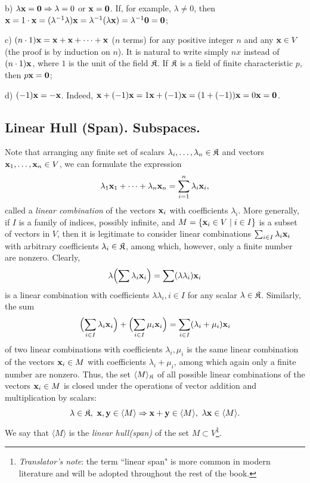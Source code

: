 b) $\lambda \vx =\v0\Rightarrow \lambda =0$ or $\vx =\v0$. If, for example, $\lambda\ne 0$, then $\vx =1\cdot\vx =(\lambda^{-1}\lambda)\vx =\lambda^{-1}(\lambda\vx)=\lambda^{-1}\v0=\v0$;

c) $(n\cdot 1){\mathbf{x}} ={\mathbf{x}} +{\mathbf{x}} +\dots +{\mathbf{x}}$ ($n$ terms) for any positive integer $n$ and any ${\mathbf{x}}\in V$ (the proof is by induction on $n$). It is natural to write simply $nx$ instead of $(n\cdot 1){\mathbf{x}}$, where $1$ is the unit of the field ${\mathfrak{K}}$. If ${\mathfrak{K}}$ is a field of finite characteristic $p$, then $p\vx =\v0$;

d) $(-1){\mathbf{x}} =-{\mathbf{x}}$. Indeed, $\vx +(-1)\vx=1\vx+(-1)\vx =(1+(-1))\vx =0\vx=\v0$.

\subsection{Linear Hull (Span). Subspaces.}\label{sec:1.1-2}
Note that arranging any finite set of scalars $\lambda_i , \dots, \lambda_n \in {\mathfrak{K}}$ and vectors ${\mathbf{x}}_1, \dots , {\mathbf{x}}_n \in V$, we can formulate the expression
\[\lambda_1 {\mathbf{x}}_1 + \dots + \lambda_n {\mathbf{x}}_n =\sum_{i=1}^n \lambda_i {\mathbf{x}}_i ,\]
called a \textit{linear combination} of the vectors ${\mathbf{x}}_i$ with coefficients $\lambda_i$. More generally, if $I$ is a family of indices, possibly infinite, and $M = \{{\mathbf{x}}_i\in V\mid i\in I\}$ is a subset of vectors in $V$, then it is legitimate to consider linear combinations $\sum_{i\in I}\lambda_i {\mathbf{x}}_i$ with arbitrary coefficients $\lambda_i \in {\mathfrak{K}}$, among which, however, only a finite number are nonzero. Clearly, 
\[\lambda\Bigl(\sum \lambda_i{\mathbf{x}}_i\Bigr)=\sum (\lambda\lambda_i){\mathbf{x}}_i\]
is a linear combination with coefficients $\lambda\lambda_i , i\in I$ for any scalar $\lambda \in {\mathfrak{K}}$. Similarly, the sum
\[\Bigl(\sum_{i\in I}\lambda_i{\mathbf{x}}_i\Bigr)+\Bigl(\sum_{i\in I}\mu_i{\mathbf{x}}_i\Bigr)=\sum_{i\in I}(\lambda_i+\mu_i){\mathbf{x}}_i\]
of two linear combinations with coefficients $\lambda_i ,\mu_i$ is the same linear combination of the vectors ${\mathbf{x}}_i\in M$ with coefficients $\lambda_i +\mu_i$, among which again only a finite number are nonzero. Thus, the set $\langle M\rangle_{\mathfrak{K}}$ of all possible linear combinations of the vectors ${\mathbf{x}}_i\in M$ is closed under the operations of vector addition and multiplication by scalars:
\[\lambda\in {\mathfrak{K}},~{{\mathbf{x}},\mathbf y}\in \langle M\rangle\Rightarrow {{\mathbf{x}}+\mathbf y} \in \langle M\rangle,~{\lambda {\mathbf{x}}}\in \langle M\rangle.\]
We say that $\langle M\rangle$ is the \textit{linear hull(span)} of the set $M\subset V$\footnote{\textit{Translator's note}: the term ``linear span" is more common in modern literature and will be adopted throughout the rest of the book.}.

